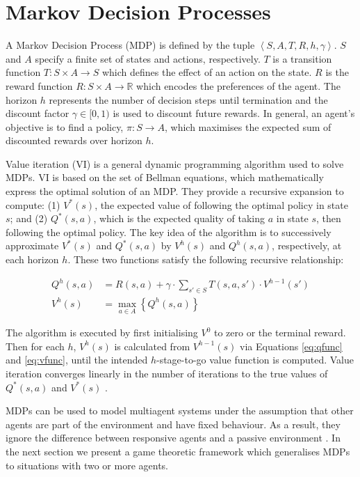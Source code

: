 \section{Markov Decision Processes}
\label{sec:mdp}

A Markov Decision Process (MDP) \cite{Howard_1960} is defined by the tuple
$ \left\langle S, A, T, R, h, \gamma \right\rangle$. $S$ and $A$ 
specify a finite set of states and actions, respectively.
$T$ is a transition function $T : S \times A \rightarrow S$ which 
defines the effect of an action on the state. $R$ is the
reward function $R : S \times A \rightarrow \mathbb{R}$ which 
encodes the preferences of the agent. The horizon $h$ represents the 
number of decision steps until termination and the discount factor $\gamma \in [0, 1)$ 
is used to discount future rewards. In general, an agent's objective is 
to find a policy, $\pi : S \rightarrow A$, which maximises the expected 
sum of discounted rewards over horizon $h$.

Value iteration (VI) \cite{Bellman_1957} is a general dynamic programming 
algorithm used to solve MDPs. VI is based on the set of Bellman equations,
which mathematically express the optimal solution of an MDP. They 
provide a recursive expansion to compute: (1) $V^{*}(s)$, the expected value of following
the optimal policy in state $s$; and (2) $Q^{*}(s, a)$, which is the expected
quality of taking $a$ in state $s$, then following the optimal policy. The
key idea of the algorithm is to successively approximate $V^{*}(s)$ and $Q^{*}(s, a)$
by $V^{h}(s)$ and $Q^{h}(s, a)$, respectively, at each horizon $h$. These 
two functions satisfy the following recursive relationship:

{\small 
\abovedisplayskip=0pt
\belowdisplayskip=0pt
\begin{align}
  Q^{h}(s, a) &= R(s, a) + \gamma \cdot \sum_{s' \in S} T(s, a, s') \cdot V^{h-1}(s') \label{eq:qfunc}\\
  V^{h}(s) &= \max_{a \in A} \left\{ Q^{h}(s, a) \right\} \label{eq:vfunc}
\end{align}
}%

The algorithm is executed by first initialising $V^{0}$  to zero or the terminal reward. 
Then for each $h$, $V^{h}(s)$ is calculated from $V^{h-1}(s)$ via
Equations \eqref{eq:qfunc} and \eqref{eq:vfunc}, until the intended 
$h$-stage-to-go value function is computed. Value iteration converges 
linearly in the number of iterations to the true values of $Q^{*}(s, a)$ and $V^{*}(s)$ 
\cite{Bertsekas_1987}.

MDPs can be used to model multiagent systems under the assumption 
that other agents are part of the environment and have fixed behaviour. 
As a result, they ignore the difference between responsive agents and 
a passive environment \cite{Hu_ICML_1998}. In the next section we 
present a game theoretic framework which generalises MDPs to 
situations with two or more agents.